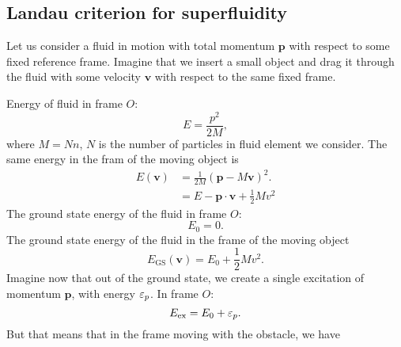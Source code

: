 \subsection{Landau criterion for superfluidity}

Let us consider a fluid in motion with total momentum $\bm{p}$ with respect to some fixed reference frame. 
Imagine that we insert a small object and drag it through the fluid with some velocity $\bm{v}$ with respect to the same fixed frame. 
\begin{center}
\end{center}	
Energy of fluid in frame $O$:
\begin{equation}
	E = \frac{p^2}{2M},
\end{equation}
where $M = Nn$, $N$ is the number of particles in fluid element we consider. 
The same energy in the fram of the moving object is 
\begin{equation}
	\begin{aligned}
	E(\bm{v}) &= \frac{1}{2M}\left (\bm{p}-M\bm{v}\right )^2. \\
	&= E - \bm{p}\cdot\bm{v} + \frac{1}{2}Mv^2
	\end{aligned}
\end{equation}
The ground state energy of the fluid in frame $O$:
\begin{equation}
	E_0 = 0.
\end{equation}
The ground state energy of the fluid in the frame of the moving object
\begin{equation}
	E_{\text{GS}}(\bm{v}) = E_0 + \frac{1}{2}Mv^2.
\end{equation}
Imagine now that out of the ground state, we create a single excitation of momentum $\bm{p}$, with energy \emph{$\varepsilon_p$}.
In frame $O$:
\begin{equation}
	E_{\text{ex}} = E_0 + \varepsilon_p.
\end{equation}
But that means that in the frame moving with the obstacle, we have

